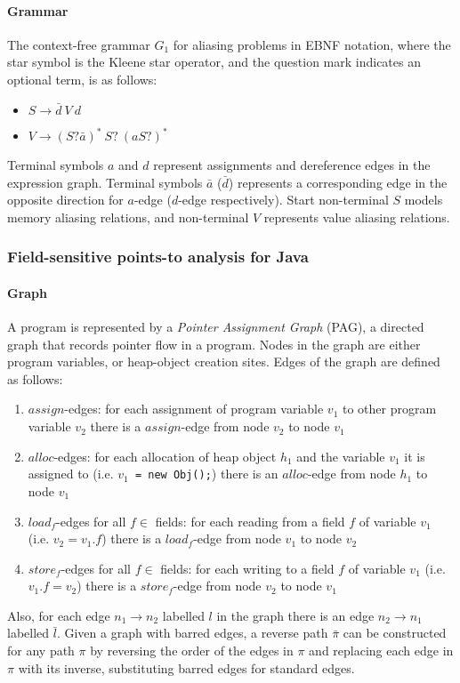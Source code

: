 \paragraph*{Grammar}
The context-free grammar $G_1$ for aliasing problems in EBNF notation, where the star symbol is the Kleene star operator, and the question mark indicates an optional term, is as follows:
\begin{itemize}
\item $S \rightarrow \bar{d}\ V\ d$
\item $V \rightarrow (S? \bar{a})^*\ S?\ (a S?)^*$
\end{itemize}
Terminal symbols $a$ and $d$ represent assignments and dereference edges in the expression graph. Terminal symbols $\bar{a}$ ($\bar{d}$) represents a corresponding edge in the opposite direction for $a$-edge ($d$-edge respectively). Start non-terminal $S$ models memory aliasing relations, and non-terminal $V$ represents value aliasing relations. 


\subsubsection{Field-sensitive points-to analysis for Java}
\label{subseq:field-sensitive}
\paragraph*{Graph}
A program is represented by a \textit{Pointer Assignment Graph} (PAG), a directed graph that records pointer flow in a program. Nodes in the graph are either program variables, or heap-object creation sites. Edges of the graph are defined as follows:
\begin{enumerate}
\item $assign$-edges: for each assignment of program variable $v_1$ to other program variable $v_2$ there is a $assign$-edge from node $v_2$ to node $v_1$
\item $alloc$-edges: for each allocation of heap object $h_1$ and the variable $v_1$ it is assigned to (i.e. \texttt{$v_1$ = new Obj();}) there is an $alloc$-edge from node $h_1$ to node $v_1$
\item $load_f$-edges for all $f \in$ fields: for each reading from a field $f$ of variable $v_1$ (i.e. $v_2 = v_1.f$) there is a $load_f$-edge from node $v_1$ to node $v_2$
\item $store_f$-edges for all $f \in$ fields: for each writing to a field $f$ of variable $v_1$ (i.e. $v_1.f = v_2$) there is a $store_f$-edge from node $v_2$ to node $v_1$
\end{enumerate}
Also, for each edge $n_1 \rightarrow n_2$ labelled $l$ in the graph there is an edge $n_2 \rightarrow n_1$ labelled $\bar{l}$. Given a graph with barred edges, a reverse path $\bar{\pi}$ can be constructed for any path $\pi$ by reversing the order of the edges in $\pi$ and replacing each edge in $\pi$ with its inverse, substituting barred edges for standard edges.

